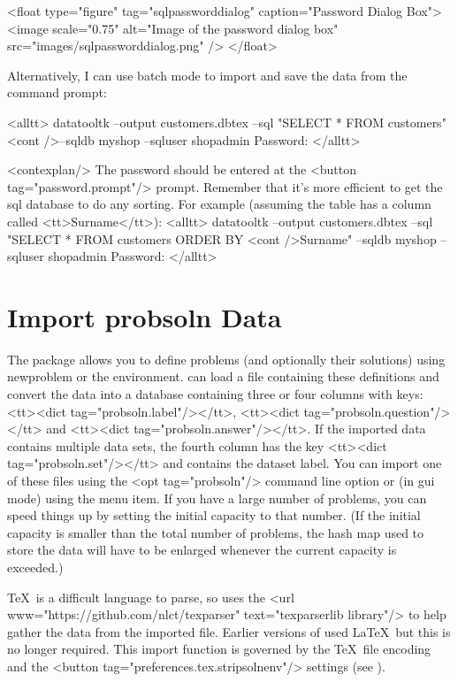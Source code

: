      <float type="figure" tag="sqlpassworddialog" caption="Password Dialog Box">
      <image scale="0.75" alt="Image of the password dialog box" src="images/sqlpassworddialog.png" />
     </float>

   Alternatively, I can use batch mode to import and save the data 
   from the command prompt:

   <alltt>
datatooltk --output customers.dbtex --sql "SELECT * FROM customers" <cont />--sqldb myshop --sqluser shopadmin
Password:
   </alltt>

   <contexplan/> The password should be entered at the <button tag="password.prompt"/>
   prompt. Remember that it's more efficient to get the \gls{sql}
   database to do any sorting. For example (assuming the table has 
   a column called <tt>Surname</tt>):
   <alltt>
datatooltk --output customers.dbtex --sql "SELECT * FROM customers ORDER BY <cont />Surname" --sqldb myshop --sqluser shopadmin
Password:
   </alltt>


\section{Import probsoln Data}\label{sec:importprobsoln}

   The  package allows you to define problems (and 
   optionally their solutions) using \gls{newproblem} or the
    environment.  can load a file
   containing these definitions and convert the  data
   into a  database containing three or four columns
   with keys: <tt><dict tag="probsoln.label"/></tt>, 
   <tt><dict tag="probsoln.question"/></tt> and
   <tt><dict tag="probsoln.answer"/></tt>. If the imported data contains
   multiple  data sets, the fourth column has the
   key <tt><dict tag="probsoln.set"/></tt> and contains the dataset label. 
   You can import one of these
   files using the <opt tag="probsoln"/> command line option or (in
   \gls{gui} mode) using the 
   menu item. If you have a large number of problems, you can speed things
   up by setting the initial capacity to that number. (If the initial
   capacity is smaller than the total number of problems, the hash map
   used to store the data will have to be enlarged whenever the current
   capacity is exceeded.)


   \TeX\ is a difficult language to parse, so  uses the
   <url www="https://github.com/nlct/texparser"
   text="texparserlib library"/> to help gather the data from the imported 
   file. Earlier versions of  used \LaTeX\ but this is no longer 
   required. This import function is governed by the \TeX\ file encoding
   and the <button tag="preferences.tex.stripsolnenv"/> settings 
   (see ).


